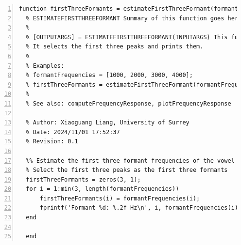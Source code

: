 \documentclass{article}
\begin{document}
\begin{lstlisting}[frame=single, numbers=left, style=Matlab-editor, caption={estimateFirstThreeFormant.m}, label={lst:estimateFirstThreeFormant}]
  function firstThreeFormants = estimateFirstThreeFormant(formantFrequencies)
  % ESTIMATEFIRSTTHREEFORMANT Summary of this function goes here
  %
  % [OUTPUTARGS] = ESTIMATEFIRSTTHREEFORMANT(INPUTARGS) This function estimates the first three formant frequencies from the given formant frequencies.
  % It selects the first three peaks and prints them.
  %
  % Examples:
  % formantFrequencies = [1000, 2000, 3000, 4000];
  % firstThreeFormants = estimateFirstThreeFormant(formantFrequencies);
  %
  % See also: computeFrequencyResponse, plotFrequencyResponse
  
  % Author: Xiaoguang Liang, University of Surrey
  % Date: 2024/11/01 17:52:37
  % Revision: 0.1
  
  %% Estimate the first three formant frequencies of the vowel
  % Select the first three peaks as the first three formants
  firstThreeFormants = zeros(3, 1);
  for i = 1:min(3, length(formantFrequencies))
      firstThreeFormants(i) = formantFrequencies(i);
      fprintf('Formant %d: %.2f Hz\n', i, formantFrequencies(i));
  end
  
  end

\end{lstlisting}
\end{document}
